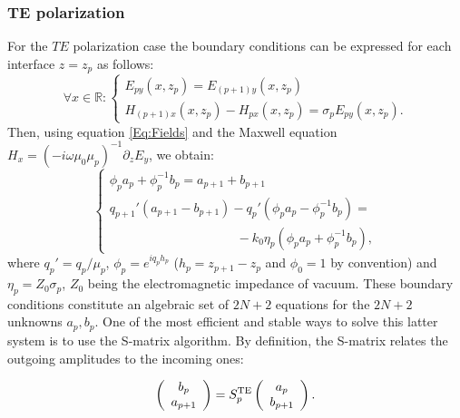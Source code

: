 \documentclass[aps,pra,superscriptaddress,amsmath,amssymb,showpacs,twocolumn,notitlepage]{revtex4-1}
\begin{document}
\subsubsection{TE polarization} 
For the $TE$ polarization case the boundary conditions can be expressed for each interface $z=z_p$ as follows:
\begin{equation} \label{Eq:TE_BondCond1}
\forall x \in \mathbb{R}: \left\{ \begin{array}{ll}
E_{py}(x,z_p)=E_{(p+1)y}(x,z_p) \\ H_{(p+1)x}(x,z_p)-H_{px}(x,z_p)=\sigma_pE_{py}(x,z_p).
\end{array} \right. 
\end{equation}
%
Then, using equation \eqref{Eq:Fields} and the Maxwell equation $H_x=(-i\omega\mu_0\mu_p)^{-1}\partial_zE_y$, we obtain:
%
 \begin{equation} \label{Eq:TE_BondCond2}
\left\{ \begin{array}{ll|}
\phi_pa_p+\phi_p^{-1}b_p=a_{p+1}+b_{p+1}  \\ q_{p+1}' \left( a_{p+1}-b_{p+1} \right) - q_{p}' \left( \phi_pa_p-\phi_p^{-1}b_p \right)=\\ \;\;\;\;\;\;\;\;\;\;\;\;\;\;\;\;\;\;\;\;\;\;\;\;\;\;\;\;\;\;\;\;\;\;\;\;-k_0 \eta_p \left(\phi_pa_p+\phi_p^{-1}b_p \right),
\end{array} \right. 
\end{equation}
%
where $q_p'=q_p/\mu_p$, $\phi_p=e^{iq_ph_p}$ ($h_p=z_{p+1}-z_p$ and $\phi_0=1$ by convention)  and $\eta_p=Z_0\sigma_p$, $Z_0$ being the electromagnetic impedance of vacuum. These boundary conditions constitute an algebraic set of $2N+2$ equations for the $2N+2$ unknowns $a_p, b_p$. One of the most efficient and stable ways to solve this latter system is to use the S-matrix algorithm. By definition, the S-matrix relates the outgoing amplitudes to the incoming ones:  

\begin{equation} \label{Eq:TE_BondCond_Smat1}
\left(\begin{array}{c}  b_p  \\  a_{p+1} \end{array} \right) = S_p^{\rm{TE}} \left(\begin{array}{c}  a_p  \\  b_{p+1} \end{array} \right).
\end{equation}
\end{document}
